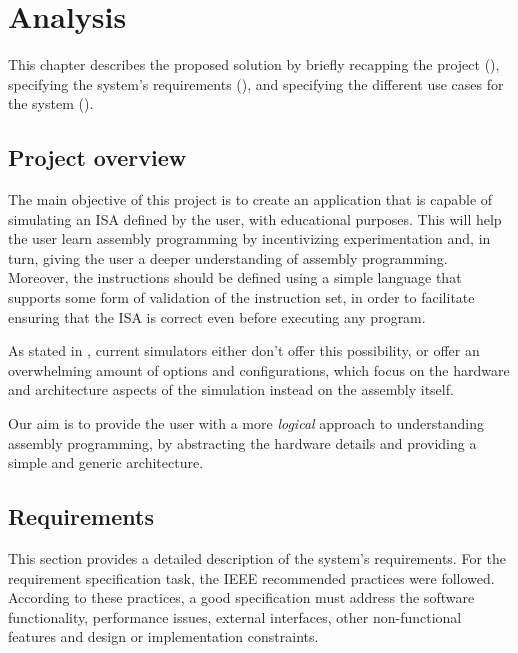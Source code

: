 \chapter{Analysis}\label{chap:analysis}
This chapter describes the proposed solution by briefly recapping the project (), specifying the system's requirements (), and specifying the different use cases for the system ().



\section{Project overview}\label{sec:project-description}
The main objective of this project is to create an application that is capable of simulating an \gls{ISA} defined by the user, with educational purposes. This will help the user learn \gls{assembly} programming by incentivizing experimentation and, in turn, giving the user a deeper understanding of \gls{assembly} programming. Moreover, the instructions should be defined using a simple language that supports some form of validation of the instruction set, in order to facilitate ensuring that the \gls{ISA} is correct even before executing any program.

As stated in , current simulators either don't offer this possibility, or offer an overwhelming amount of options and configurations, which focus on the hardware and architecture aspects of the simulation instead on the \gls{assembly} itself.

Our aim is to provide the user with a more \textit{logical} approach to understanding \gls{assembly} programming, by abstracting the hardware details and providing a simple and generic architecture.



\section{Requirements}\label{sec:requirements}
This section provides a detailed description of the system's requirements. For the requirement specification task, the IEEE recommended practices \parencite{IEEE830-1984} were followed. According to these practices, a good specification must address the software functionality, performance issues, external interfaces, other non-functional features and design or implementation constraints.

